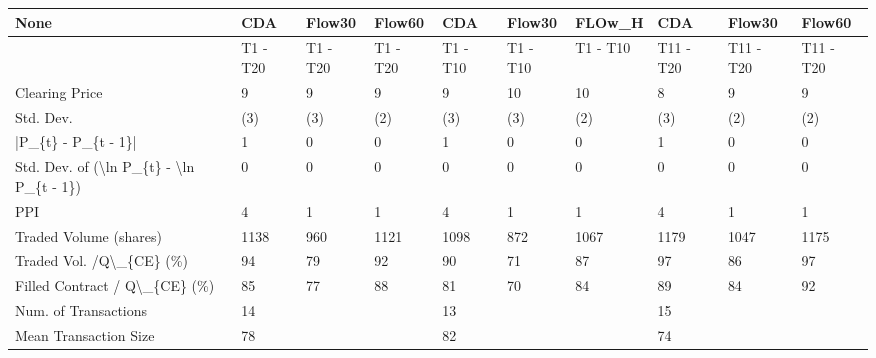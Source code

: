 \begin{tabular}{llllllllll}
\hline
 None                                                      & CDA      & Flow30    & Flow60    & CDA      & Flow30    & FLOw\_H   & CDA       & Flow30     & Flow60     \\
\hline
                                                           & T1 - T20 & T1 - T20 & T1 - T20 & T1 - T10 & T1 - T10 & T1 - T10 & T11 - T20 & T11 - T20 & T11 - T20 \\
 Clearing Price                                            & 9        & 9        & 9        & 9        & 10       & 10       & 8         & 9         & 9         \\
 Std. Dev.                                                 & (3)      & (3)      & (2)      & (3)      & (3)      & (2)      & (3)       & (2)       & (2)       \\
 |P\_\{t\} - P\_\{t - 1\}|                                       & 1        & 0        & 0        & 1        & 0        & 0        & 1         & 0         & 0         \\
 Std. Dev. of (\textbackslash{}ln P\_\{t\} - \textbackslash{}ln P\_\{t - 1\})                  & 0        & 0        & 0        & 0        & 0        & 0        & 0         & 0         & 0         \\
 PPI                                                       & 4        & 1        & 1        & 4        & 1        & 1        & 4         & 1         & 1         \\
 Traded Volume (shares)                                    & 1138     & 960      & 1121     & 1098     & 872      & 1067     & 1179      & 1047      & 1175      \\
 Traded Vol. /Q\textbackslash{}\_\{CE\} (\%)                                  & 94       & 79       & 92       & 90       & 71       & 87       & 97        & 86        & 97        \\
 Filled Contract / Q\textbackslash{}\_\{CE\} (\%)                             & 85       & 77       & 88       & 81       & 70       & 84       & 89        & 84        & 92        \\
 Num. of Transactions                                      & 14       &          &          & 13       &          &          & 15        &           &           \\
 Mean Transaction Size                                     & 78       &          &          & 82       &          &          & 74        &           &           \\

\end{tabular}
